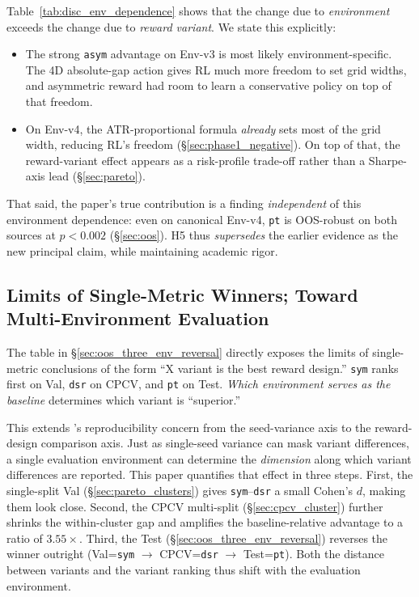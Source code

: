 \documentclass[11pt, a4paper]{article}
\begin{document}
Table~\ref{tab:disc_env_dependence} shows that the change due to
\emph{environment} exceeds the change due to \emph{reward variant}. We state
this explicitly:
\begin{itemize}[leftmargin=*]
\item The strong \texttt{asym} advantage on Env-v3 is most likely
environment-specific. The 4D absolute-gap action gives RL much more
freedom to set grid widths, and asymmetric reward had room to learn a
conservative policy on top of that freedom.
\item On Env-v4, the ATR-proportional formula \emph{already} sets most of
the grid width, reducing RL's freedom (\S\ref{sec:phase1_negative}). On top
of that, the reward-variant effect appears as a risk-profile trade-off
rather than a Sharpe-axis lead (\S\ref{sec:pareto}).
\end{itemize}

That said, the paper's true contribution is a finding \emph{independent} of
this environment dependence: even on canonical Env-v4, \texttt{pt} is
OOS-robust on both sources at $p < 0.002$ (\S\ref{sec:oos}). H5 thus
\emph{supersedes} the earlier evidence as the new principal claim, while
maintaining academic rigor.

\subsection{Limits of Single-Metric Winners; Toward Multi-Environment Evaluation}
\label{sec:disc_multi_env}

The table in \S\ref{sec:oos_three_env_reversal} directly exposes the limits
of single-metric conclusions of the form ``X variant is the best reward
design.'' \texttt{sym} ranks first on Val, \texttt{dsr} on CPCV, and
\texttt{pt} on Test. \emph{Which environment serves as the baseline}
determines which variant is ``superior.''

This extends \citet{henderson2018rlreproducibility}'s reproducibility
concern from the seed-variance axis to the reward-design comparison axis.
Just as single-seed variance can mask variant differences, a single
evaluation environment can determine the \emph{dimension} along which
variant differences are reported. This paper quantifies that effect in three
steps. First, the single-split Val (\S\ref{sec:pareto_clusters}) gives
\texttt{sym}--\texttt{dsr} a small Cohen's $d$, making them look close.
Second, the CPCV multi-split (\S\ref{sec:cpcv_cluster}) further shrinks the
within-cluster gap and amplifies the baseline-relative advantage to a ratio
of $3.55\times$. Third, the Test (\S\ref{sec:oos_three_env_reversal})
reverses the winner outright (Val=\texttt{sym} $\to$ CPCV=\texttt{dsr} $\to$
Test=\texttt{pt}). Both the distance between variants and the variant ranking
thus shift with the evaluation environment.
\end{document}
